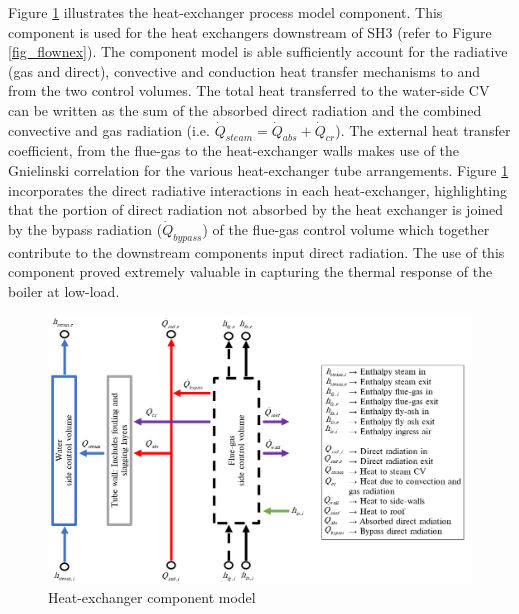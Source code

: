 \documentclass[review]{elsarticle}
\begin{document}
Figure \ref{fig_heat_exchanger_model} illustrates the heat-exchanger process model component. This component is used for the heat exchangers downstream of SH3 (refer to Figure \ref{fig_flownex}). The component model is able sufficiently account for the radiative (gas and direct), convective and conduction heat transfer mechanisms to and from the two control volumes. The total heat transferred to the water-side CV can be written as the sum of the absorbed direct radiation and the combined convective and gas radiation (i.e. $\dot{Q}_{steam}=\dot{Q}_{abs}+\dot{Q}_{cr}$). The external heat transfer coefficient, from the flue-gas to the heat-exchanger walls makes use of the Gnielinski correlation \cite{Gnielinski2016} for the various heat-exchanger tube arrangements. Figure \ref{fig_heat_exchanger_model} incorporates the direct radiative interactions in each heat-exchanger, highlighting that the portion of direct radiation not absorbed by the heat exchanger is joined by the bypass radiation ($\dot{Q}_{bypass}$) of the flue-gas control volume which together contribute to the downstream components input direct radiation. The use of this component proved extremely valuable in capturing the thermal response of the boiler at low-load.

\begin{figure}[h!]
\centerline{\includegraphics[scale=0.5]{HEAT_EXCHANGER_PROCESS_MODEL}}
\caption{Heat-exchanger component model}
\label{fig_heat_exchanger_model}
\end{figure}

\newpage
\end{document}
